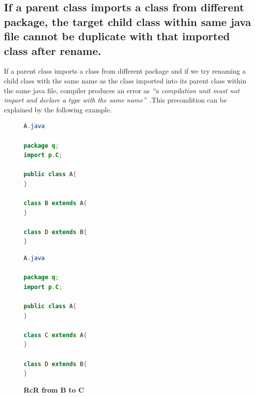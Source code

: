 \subsection{If a parent class imports a class from different package, the target child class within same java file cannot be duplicate with that imported class after rename.}

If a parent class imports a class from different package and if we try renaming a child class with the same name as the class imported into its parent class within the same java file, compiler produces an error as \textit{``a compilation unit must not import and declare a type with the same name''}~\cite{EclipseWebPage}.This precondition can be explained by the following example.

\begin{figure}[th]
\centering
\begin{minipage}[t]{0.45\linewidth}
\begin{lstlisting}[language=java, basicstyle=\scriptsize\ttfamily,frame=single]	
A.java

package q;
import p.C;

public class A{	
}

class B extends A{	
}

class D extends B{
}
\end{lstlisting}
\end{minipage}
\hfill
\begin{minipage}[t]{0.45\linewidth}
\begin{lstlisting}[language=java, basicstyle=\scriptsize\ttfamily,frame=single]
A.java

package q;
import p.C;

public class A{	
}

class C extends A{	
}

class D extends B{
}	
\end{lstlisting}
\end{minipage}
\caption{\textbf{RcR from B to C}}
\label{figure:figpc3_1}
\end{figure}

